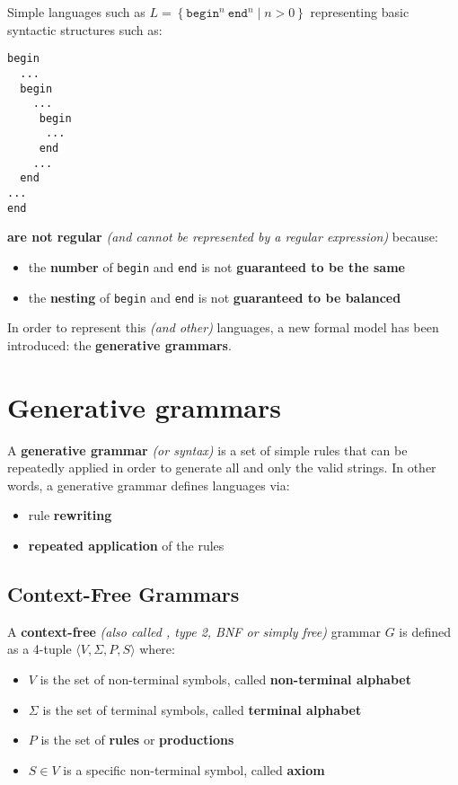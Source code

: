 \documentclass[english]{article}
\begin{document}
Simple languages such as \(L = \left\{ \texttt{begin}^n \ \texttt{end}^n \mid n > 0 \right\}\) representing basic syntactic structures such as:

\begin{verbatim}
begin
  ...
  begin
    ...
     begin
      ...
     end
    ...
  end
...
end
\end{verbatim}

\textbf{are not regular} \textit{(and cannot be represented by a regular expression)} because:

\begin{itemize}
  \item the \textbf{number} of \texttt{begin} and \texttt{end} is not \textbf{guaranteed to be the same}
  \item the \textbf{nesting} of \texttt{begin} and \texttt{end} is not \textbf{guaranteed to be balanced}
\end{itemize}

\bigskip
In order to represent this \textit{(and other)} languages, a new formal model has been introduced: the \textbf{generative grammars}.

\clearpage

\section{Generative grammars}

A \textbf{generative grammar} \textit{(or syntax)} is a set of simple rules that can be repeatedly applied in order to generate all and only the valid strings.
In other words, a generative grammar defines languages via:

\begin{itemize}
  \item rule \textbf{rewriting}
  \item \textbf{repeated application} of the rules
\end{itemize}

\subsection{Context-Free Grammars}

A \textbf{context-free} \textit{(also called \CF, type 2, BNF or simply free)} grammar \(G\) is defined as a 4-tuple \(\langle V, \Sigma, P, S\rangle\) where:

\begin{itemize}
  \item \(V\) is the set of non-terminal symbols, called \textbf{non-terminal alphabet}
  \item \(\Sigma\) is the set of terminal symbols, called \textbf{terminal alphabet}
  \item \(P\) is the set of \textbf{rules} or \textbf{productions}
  \item \(S \in V\) is a specific non-terminal symbol, called \textbf{axiom}
\end{itemize}
\end{document}
